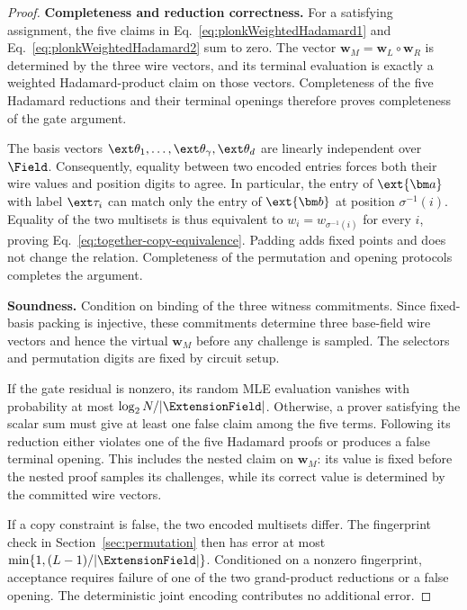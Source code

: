 \begin{proof}
\noindent\textbf{Completeness and reduction correctness.}
For a satisfying assignment, the five claims in
Eq.~\eqref{eq:plonkWeightedHadamard1} and
Eq.~\eqref{eq:plonkWeightedHadamard2} sum to zero.
The vector \(\bm w_M=\bm w_L\circ\bm w_R\) is determined
by the three wire vectors, and its terminal evaluation is
exactly a weighted Hadamard-product claim on those vectors.
Completeness of the five Hadamard reductions and their terminal
openings therefore proves completeness of the gate argument.

The basis vectors \(\ext\theta_1,\ldots,\ext\theta_\gamma,
\ext\theta_d\) are linearly independent over \(\Field\).
Consequently, equality between two encoded entries forces both
their wire values and position digits to agree.
In particular, the entry of \(\ext{\bm a}\) with label
\(\ext\tau_i\) can match only the entry of \(\ext{\bm b}\)
at position \(\sigma^{-1}(i)\).
Equality of the two multisets is thus equivalent to
\(w_i=w_{\sigma^{-1}(i)}\) for every \(i\), proving
Eq.~\eqref{eq:together-copy-equivalence}.
Padding adds fixed points and does not change the relation.
Completeness of the permutation and opening protocols completes
the argument.

\noindent\textbf{Soundness.}
Condition on binding of the three witness commitments.
Since fixed-basis packing is injective, these commitments determine
three base-field wire vectors and hence the virtual \(\bm w_M\)
before any challenge is sampled.
The selectors and permutation digits are fixed by circuit setup.

If the gate residual is nonzero, its random MLE evaluation
vanishes with probability at most \(\log_2N/|\ExtensionField|\).
Otherwise, a prover satisfying the scalar sum must give at least
one false claim among the five terms.
Following its reduction either violates one of the five
Hadamard proofs or produces a false terminal opening.
This includes the nested claim on \(\bm w_M\): its value is
fixed before the nested proof samples its challenges, while
its correct value is determined by the committed wire vectors.

If a copy constraint is false, the two encoded multisets differ.
The fingerprint check in Section~\ref{sec:permutation} then has
error at most \(\min\{1,(L-1)/|\ExtensionField|\}\).
Conditioned on a nonzero fingerprint, acceptance requires failure
of one of the two grand-product reductions or a false opening.
The deterministic joint encoding contributes no additional error.


\end{proof}
